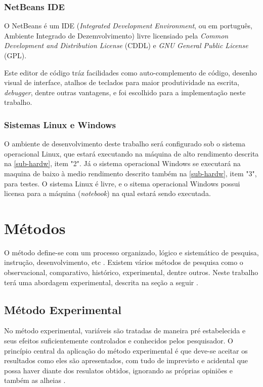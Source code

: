 \subsubsection{NetBeans IDE}\label{subsec:netbeans}
O NetBeans é um IDE (\textit{Integrated Development Environment}, ou em português, Ambiente Integrado de Dezemvolvimento) livre licensiado pela \textit{Common Development and Distribution License} (CDDL) e \textit{GNU General Public License} (GPL).

Este editor de código tráz facilidades como auto-complemento de código, desenho visual de interface, atalhos de teclados para maior produtividade na escrita, \textit{debugger}, dentre outras vantagens, e foi escolhido para a implementação neste trabalho.

\subsubsection{Sistemas Linux e Windows}\label{subsec:linux}
O ambiente de desenvolvimento deste trabalho será configurado sob o sistema operacional Linux, que estará executando na máquina de alto rendimento descrita na \autoref{sub-hardw}, item "2". Já o sistema operacional Windows se executará na maquina de baixo à medio rendimento descrito também na \autoref{sub-hardw}, item "3", para testes. O sistema Linux é livre, e o sitema operacional Windows possui licensa para a máquina (\textit{notebook}) na qual estará sendo executada.


\section{Métodos}\label{sec:metodos}
O método define-se com um processo organizado, lógico e sistemático de pesquisa, instrução, desenvolvimento, etc \cite{dicio-metodo}. Existem vários métodos de pesquisa como o observacional, comparativo, histórico, experimental, dentre outros. Neste trabalho terá uma abordagem experimental, descrita na seção a seguir \cite{fachin-metodos}.


\subsection{Método Experimental}

No método experimental, variáveis são tratadas de maneira pré estabelecida e seus efeitos suficientemente controlados  e conhecidos pelos pesquisador. O princípio central da aplicação do método experimental é que deve-se aceitar os resultados como eles são apresentados, com tudo de imprevisto e acidental que possa haver diante dos resulatos obtidos, ignorando as próprias opiniões e também as alheias \cite{fachin-metodos}.

